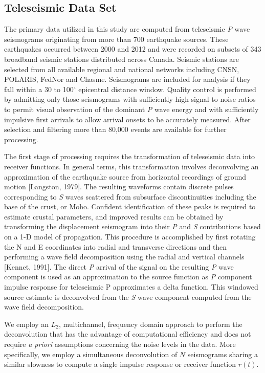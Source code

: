 \documentclass[draft, 12pt]{article}
\begin{document}
\subsection{Teleseismic Data Set}
The primary data utilized in this study are computed from teleseismic {\it P} wave seismograms originating from more than 700 earthquake sources. These earthquakes occurred between 2000 and 2012 and were recorded on subsets of 343 broadband seismic stations distributed across Canada. Seismic stations are selected from all available regional and national networks including CNSN, POLARIS, FedNor and Chasme. Seismograms are included for analysis if they fall within a 30 to 100$^\circ$ epicentral distance window. Quality control is performed by admitting only those seismograms with sufficiently high signal to noise ratios to permit visual observation of the dominant {\it P} wave energy and with sufficiently impulsive first arrivals to allow arrival onsets to be accurately measured. After selection and filtering more than 80,000 events are available for further processing.

The first stage of processing requires the transformation of teleseismic data into receiver functions. In general terms, this transformation involves deconvolving an approximation of the earthquake source from horizontal recordings of ground motion [Langston, 1979]. The resulting waveforms contain discrete pulses corresponding to {\it S} waves scattered from subsurface discontinuities including the base of the crust, or Moho. Confident identification of these peaks is required to estimate crustal parameters, and improved results can be obtained by transforming the displacement seismogram into their {\it P} and {\it S} contributions based on a 1-D model of propagation. This procedure is accomplished by first rotating the N and E coordinates into radial and transverse directions and then performing a wave field decomposition using the radial and vertical channels [Kennet, 1991]. The direct {\it P} arrival of the signal on the resulting {\it P} wave component is used as an approximation to the source function as {\it P} component impulse response for teleseismic P approximates a delta function. This windowed source estimate is deconvolved from the {\it S} wave component computed from the wave field decomposition.

We employ an $L_2$, multichannel, frequency domain approach to perform the deconvolution that has the advantage of computational efficiency and does not require {\it a priori} assumptions concerning the noise levels in the data. More specifically, we employ a simultaneous deconvolution of $N$ seismograms sharing a similar slowness to compute a single impulse response or receiver function $r(t)$.
\end{document}
